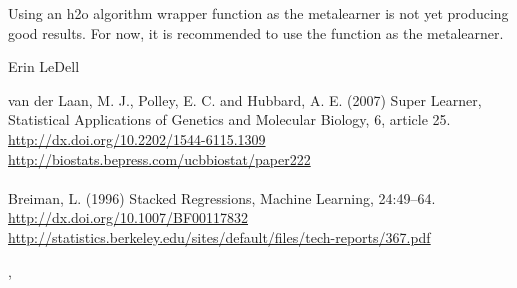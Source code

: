 \documentclass[a4paper]{book}
\begin{document}
%
\begin{Note}\relax
Using an h2o algorithm wrapper function as the metalearner is not yet producing good results.  For now, it is recommended to use the  function as the metalearner.
\end{Note}
%
\begin{Author}\relax
Erin LeDell 
\end{Author}
%
\begin{References}\relax
van der Laan, M. J., Polley, E. C. and Hubbard, A. E. (2007) Super Learner, Statistical Applications of Genetics and Molecular Biology, 6, article 25. \\{}
\url{http://dx.doi.org/10.2202/1544-6115.1309}\\{}
\url{http://biostats.bepress.com/ucbbiostat/paper222}\\{}
\\{}
Breiman, L. (1996) Stacked Regressions, Machine Learning, 24:49–64.\\{}
\url{http://dx.doi.org/10.1007/BF00117832}\\{}
\url{http://statistics.berkeley.edu/sites/default/files/tech-reports/367.pdf}
\end{References}
%
\begin{SeeAlso}\relax
{}, 
\end{SeeAlso}
%
\end{document}
